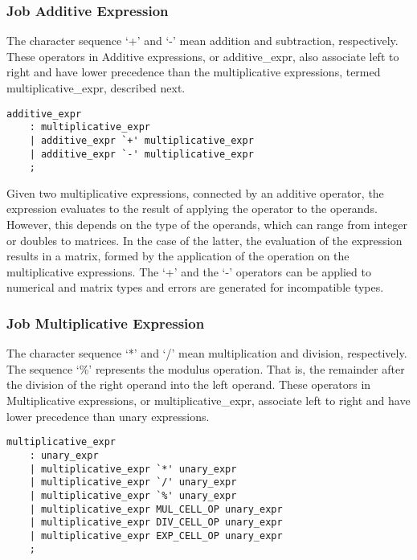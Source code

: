 \documentclass[prodmode,acmtecs]{acmsmall}
\begin{document}

\subsubsection{Job Additive Expression}

The character sequence `+' and `-' mean addition and subtraction, 
respectively. These operators in Additive expressions, or additive\_expr, 
also associate left to right and have lower precedence than the 
multiplicative expressions, termed multiplicative\_expr, described next.

\begin{lstlisting}
additive_expr
	: multiplicative_expr
	| additive_expr `+' multiplicative_expr
	| additive_expr `-' multiplicative_expr
	;
\end{lstlisting}

Given two multiplicative expressions, connected by an additive operator, 
the expression evaluates to the result of applying the operator to the
operands. However, this depends on the type of the operands, which can
range from integer or doubles to matrices. In the case of the latter,
the evaluation of the expression results in a matrix, formed by the 
application of the operation on the multiplicative expressions.
The `+' and the `-' operators can be applied to numerical and matrix types 
and errors are generated for incompatible types.
\medskip

\subsubsection{Job Multiplicative Expression}

The character sequence `*' and `/' mean multiplication and division, 
respectively. The sequence `\%' represents the modulus operation. That
is, the remainder after the division of the right operand into the left
operand. These operators in Multiplicative expressions, or 
multiplicative\_expr, associate left to right and have lower precedence 
than unary expressions.

\begin{lstlisting}
multiplicative_expr
	: unary_expr
	| multiplicative_expr `*' unary_expr
	| multiplicative_expr `/' unary_expr
	| multiplicative_expr `%' unary_expr
	| multiplicative_expr MUL_CELL_OP unary_expr
	| multiplicative_expr DIV_CELL_OP unary_expr
	| multiplicative_expr EXP_CELL_OP unary_expr
	;
\end{lstlisting}
\end{document}
